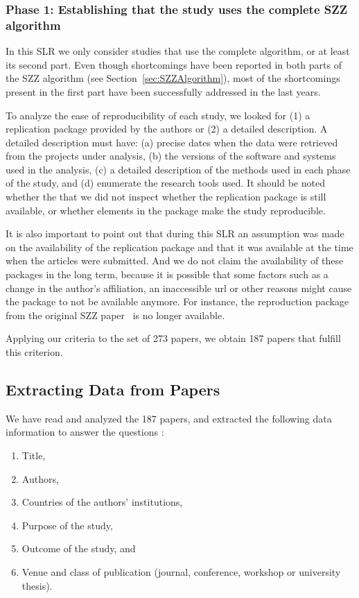 \documentclass[a4paper, 12pt]{book}
\begin{document}
\subsubsection{Phase 1: Establishing that the study uses the complete SZZ algorithm}

In this SLR we only consider studies that use the complete algorithm, or at least its second part. Even though shortcomings have been reported in both parts of the SZZ algorithm (see Section~\ref{sec:SZZAlgorithm}), most of the shortcomings present in the first part have been successfully addressed in the last years.%

To analyze the ease of reproducibility of each study, we looked for (1) a replication package provided by the authors or (2) a detailed description. A detailed description must have: (a) precise dates when the data were retrieved from the projects under analysis, (b) the versions of the software and systems used in the analysis, (c) a detailed description of the methods used in each phase of the study, and (d) enumerate the research tools used. It should be noted whether the that we did not inspect whether the replication package is still available, or whether elements in the package make the study reproducible.

It is also important to point out that during this SLR an assumption was made on the availability of the replication package and that it was available at the time when the articles were submitted. And we do not claim the availability of these packages in the long term, because it is possible that some factors such as a change in the author's affiliation, an inaccessible url or other reasons might cause the package to not be available anymore. For instance, the reproduction package from the original SZZ paper~\cite{sliwerski2005changes} is no longer available.

Applying our criteria to the set of 273 papers, we obtain 187 papers that fulfill this criterion.

\subsection{Extracting Data from Papers}

We have read and analyzed the 187 papers, and extracted the following data information to answer the questions :
\begin{enumerate} 
  \item Title, 
  \item Authors,
  \item Countries of the authors' institutions,
  \item Purpose of the study,
  \item Outcome of the study, and
  \item Venue and class of publication (journal, conference, workshop or university thesis). 
\end{enumerate}
\end{document}
